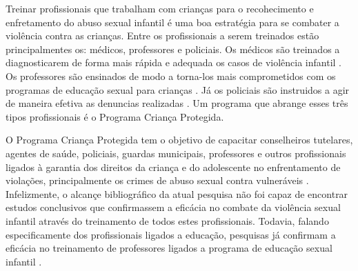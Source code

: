 Treinar profissionais que trabalham com crianças para o recohecimento e enfretamento do abuso sexual infantil é uma boa estratégia para se combater a violência contra as crianças. Entre os profissionais a serem treinados estão principalmentes os: médicos, professores e policiais. Os médicos são treinados a diagnosticarem de forma mais rápida e adequada os casos de violência infantil \cite{de2012violencia}. Os professores são ensinados de modo a torna-los mais comprometidos com os programas de educação sexual para crianças \cite{dip2016advancing}. Já os policiais são instruidos a agir de maneira efetiva as denuncias realizadas \cite{pelisoli2010prevenccao}. 
Um programa que abrange esses três tipos profissionais é o Programa Criança Protegida. 


O Programa Criança Protegida tem o objetivo de capacitar conselheiros tutelares, agentes de saúde, policiais, guardas municipais, professores e outros profissionais ligados à garantia dos direitos da criança e do adolescente no enfrentamento de violações, principalmente os crimes de abuso sexual contra vulneráveis \cite{humanos2019ibero}. Infelizmente, o alcançe bibliográfico da atual pesquisa não foi capaz de encontrar estudos conclusivos que confirmassem a eficácia no combate da violência sexual infantil através do treinamento de todos estes profissionais. Todavia, falando especificamente dos profissionais ligados a educação, pesquisas já confirmam a eficácia no treinamento de professores ligados a programa de educação sexual infantil \cite{dip2016advancing}. 








